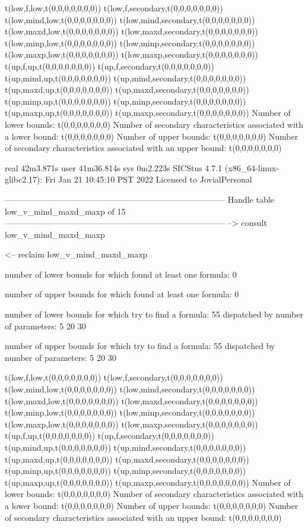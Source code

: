 t(low,f,low,t(0,0,0,0,0,0,0))
t(low,f,secondary,t(0,0,0,0,0,0,0))
t(low,mind,low,t(0,0,0,0,0,0,0))
t(low,mind,secondary,t(0,0,0,0,0,0,0))
t(low,maxd,low,t(0,0,0,0,0,0,0))
t(low,maxd,secondary,t(0,0,0,0,0,0,0))
t(low,minp,low,t(0,0,0,0,0,0,0))
t(low,minp,secondary,t(0,0,0,0,0,0,0))
t(low,maxp,low,t(0,0,0,0,0,0,0))
t(low,maxp,secondary,t(0,0,0,0,0,0,0))
t(up,f,up,t(0,0,0,0,0,0,0))
t(up,f,secondary,t(0,0,0,0,0,0,0))
t(up,mind,up,t(0,0,0,0,0,0,0))
t(up,mind,secondary,t(0,0,0,0,0,0,0))
t(up,maxd,up,t(0,0,0,0,0,0,0))
t(up,maxd,secondary,t(0,0,0,0,0,0,0))
t(up,minp,up,t(0,0,0,0,0,0,0))
t(up,minp,secondary,t(0,0,0,0,0,0,0))
t(up,maxp,up,t(0,0,0,0,0,0,0))
t(up,maxp,secondary,t(0,0,0,0,0,0,0))
Number of lower bounds:                                             t(0,0,0,0,0,0,0)
Number of secondary characteristics associated with a lower bound:  t(0,0,0,0,0,0,0)
Number of upper bounds:                                             t(0,0,0,0,0,0,0)
Number of secondary characteristics associated with an upper bound: t(0,0,0,0,0,0,0)

real	42m3.871s
user	41m36.814s
sys	0m2.223s
SICStus 4.7.1 (x86_64-linux-glibc2.17): Fri Jan 21 10:45:10 PST 2022
Licensed to JovialPersonal


--------------------------------------------------------------------------------
Handle table low_v_mind_maxd_maxp of 15
--------------------------------------------------------------------------------
--> consult low_v_mind_maxd_maxp

<-- reclaim low_v_mind_maxd_maxp

number of lower bounds for which found at least one formula: 0

number of upper bounds for which found at least one formula: 0

number of lower bounds for which try to find a formula: 55
dispatched by number of parameters: 5  20  30

number of upper bounds for which try to find a formula: 55
dispatched by number of parameters: 5  20  30

t(low,f,low,t(0,0,0,0,0,0,0))
t(low,f,secondary,t(0,0,0,0,0,0,0))
t(low,mind,low,t(0,0,0,0,0,0,0))
t(low,mind,secondary,t(0,0,0,0,0,0,0))
t(low,maxd,low,t(0,0,0,0,0,0,0))
t(low,maxd,secondary,t(0,0,0,0,0,0,0))
t(low,minp,low,t(0,0,0,0,0,0,0))
t(low,minp,secondary,t(0,0,0,0,0,0,0))
t(low,maxp,low,t(0,0,0,0,0,0,0))
t(low,maxp,secondary,t(0,0,0,0,0,0,0))
t(up,f,up,t(0,0,0,0,0,0,0))
t(up,f,secondary,t(0,0,0,0,0,0,0))
t(up,mind,up,t(0,0,0,0,0,0,0))
t(up,mind,secondary,t(0,0,0,0,0,0,0))
t(up,maxd,up,t(0,0,0,0,0,0,0))
t(up,maxd,secondary,t(0,0,0,0,0,0,0))
t(up,minp,up,t(0,0,0,0,0,0,0))
t(up,minp,secondary,t(0,0,0,0,0,0,0))
t(up,maxp,up,t(0,0,0,0,0,0,0))
t(up,maxp,secondary,t(0,0,0,0,0,0,0))
Number of lower bounds:                                             t(0,0,0,0,0,0,0)
Number of secondary characteristics associated with a lower bound:  t(0,0,0,0,0,0,0)
Number of upper bounds:                                             t(0,0,0,0,0,0,0)
Number of secondary characteristics associated with an upper bound: t(0,0,0,0,0,0,0)

